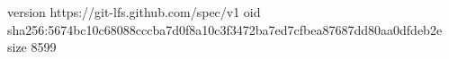 version https://git-lfs.github.com/spec/v1
oid sha256:5674bc10c68088cccba7d0f8a10c3f3472ba7ed7cfbea87687dd80aa0dfdeb2e
size 8599
